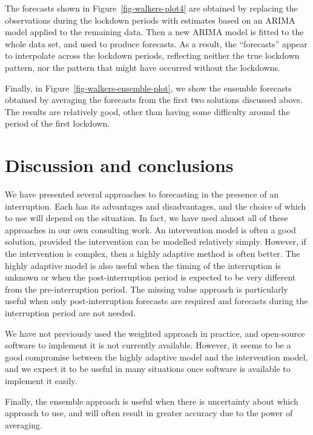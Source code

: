 \documentclass[
  11pt,
  a4paper,
]{article}
\begin{document}
The forecasts shown in Figure~\ref{fig-walkers-plot4} are obtained by
replacing the observations during the lockdown periods with estimates
based on an ARIMA model applied to the remaining data. Then a new ARIMA
model is fitted to the whole data set, and used to produce forecasts. As
a result, the ``forecasts'' appear to interpolate across the lockdown
periods, reflecting neither the true lockdown pattern, nor the pattern
that might have occurred without the lockdowns.

Finally, in Figure~\ref{fig-walkers-ensemble-plot}, we show the ensemble
forecasts obtained by averaging the forecasts from the first two
solutions discussed above. The results are relatively good, other than
having some difficulty around the period of the first lockdown.

\section{Discussion and conclusions}\label{sec-conclusions}

We have presented several approaches to forecasting in the presence of
an interruption. Each has its advantages and disadvantages, and the
choice of which to use will depend on the situation. In fact, we have
used almost all of these approaches in our own consulting work. An
intervention model is often a good solution, provided the intervention
can be modelled relatively simply. However, if the intervention is
complex, then a highly adaptive method is often better. The highly
adaptive model is also useful when the timing of the interruption is
unknown or when the post-interruption period is expected to be very
different from the pre-interruption period. The missing value approach
is particularly useful when only post-interruption forecasts are
required and forecasts during the interruption period are not needed.

We have not previously used the weighted approach in practice, and
open-source software to implement it is not currently available.
However, it seems to be a good compromise between the highly adaptive
model and the intervention model, and we expect it to be useful in many
situations once software is available to implement it easily.

Finally, the ensemble approach is useful when there is uncertainty about
which approach to use, and will often result in greater accuracy due to
the power of averaging.
\end{document}
